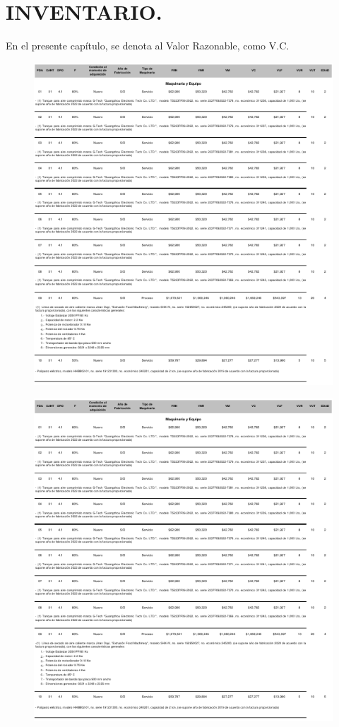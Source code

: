 \chapter{INVENTARIO.} %

En el presente capítulo, se denota al Valor Razonable, como V.C.

\begin{figure}[hbtp!]
	\centering
	\includegraphics[width=  0.9\linewidth, page = 1]{../0.imagenes/CAP_10/cap_10}
\end{figure}
\newpage

\begin{figure}[hbtp!]
	\centering
	\includegraphics[width=  \linewidth, page = 2]{../0.imagenes/CAP_10/cap_10}
\end{figure}
\newpage

